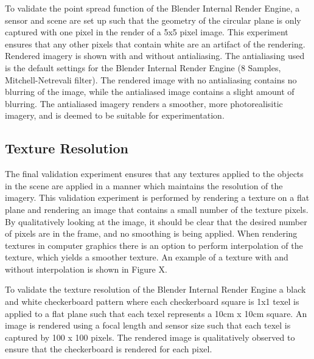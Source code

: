 To validate the point spread function of the Blender Internal Render Engine, a sensor and scene are set up such that the geometry of the circular plane is only captured with one pixel in the render of a 5x5 pixel image.  This experiment ensures that any other pixels that contain white are an artifact of the rendering.  Rendered imagery is shown with and without antialiasing.  The antialiasing used is the default settings for the Blender Internal Render Engine (8 Samples, Mitchell-Netrevali filter).  The rendered image with no antialiasing contains no blurring of the image, while the antialiased image contains a slight amount of blurring.  The antialiased imagery renders a smoother, more photorealisitic imagery, and is deemed to be suitable for experimentation. 

\subsection{Texture Resolution}
The final validation experiment ensures that any textures applied to the objects in the scene are applied in a manner which maintains the resolution of the imagery.  This validation experiment is performed by rendering a texture on a flat plane and rendering an image that contains a small number of the texture pixels.  By qualitatively looking at the image, it should be clear that the desired number of pixels are in the frame, and no smoothing is being applied.  When rendering textures in computer graphics there is an option to perform interpolation of the texture, which yields a smoother texture.  An example of a texture with and without interpolation is shown in Figure X. 

To validate the texture resolution of the Blender Internal Render Engine a black and white checkerboard pattern where each checkerboard square is 1x1 texel is applied to a flat plane such that each texel represents a 10cm x 10cm square.  An image is rendered using a focal length and sensor size such that each texel is captured by 100 x 100 pixels.  The rendered image is qualitatively observed to ensure that the checkerboard is rendered for each pixel.   


